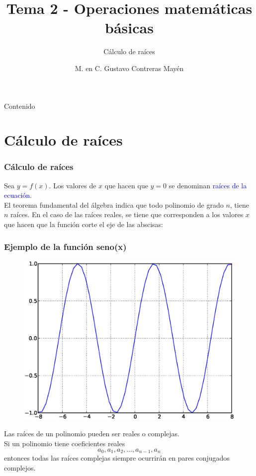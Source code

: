 \documentclass[12pt]{beamer}
\title{Tema 2 - Operaciones matem\'{a}ticas b\'{a}sicas}
\subtitle{C\'{a}lculo de ra\'{i}ces}
\author{M. en C. Gustavo Contreras May\'{e}n}
\begin{document}
\maketitle
\fontsize{14}{14}\selectfont
{}
\begin{frame}{Contenido}
\tableofcontents[pausesections]
\end{frame}
\section{C\'{a}lculo de ra\'{i}ces}
\begin{frame}
\frametitle{C\'{a}lculo de ra\'{i}ces}
Sea $y= f(x)$.  Los valores de $x$ que hacen que $y=0$ se
denominan \textcolor{blue}{ra\'{i}ces de la ecuaci\'{o}n}.
\\
\bigskip
El teorema fundamental del \'{a}lgebra indica que todo polinomio de grado $n$, tiene $n$ ra\'{i}ces. En el caso de las ra\'{i}ces reales, se tiene que corresponden a los valores $x$ que hacen que la funci\'{o}n corte el eje de las abscisas:
\end{frame}
\begin{frame}
\frametitle{Ejemplo de la funci\'{o}n seno(x)}
\begin{figure}
	\centering
	\includegraphics[scale=0.4]{raices00.eps} 
\end{figure}
\end{frame}
\begin{frame}
Las ra\'{i}ces de un polinomio pueden ser reales o complejas.
\\
\bigskip
Si un polinomio tiene coeficientes reales
\[ a_{0},a_{1},a_{2},\ldots,a_{n-1},a_{n} \]
entonces todas las ra\'{i}ces complejas siempre ocurrir\'{a}n en pares conjugados complejos.
\end{frame}
\end{document}
